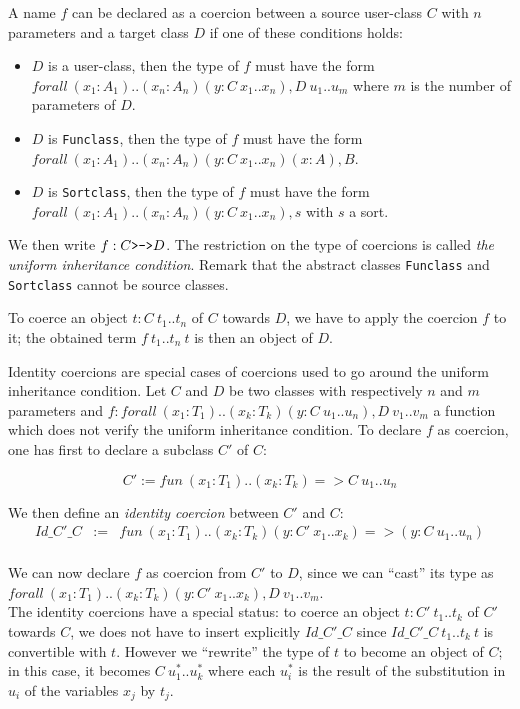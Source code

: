   A name $f$ can be declared as a coercion between a source user-class
$C$ with $n$ parameters and a target class $D$ if one of these
conditions holds:

\newcommand{\oftype}{\!:\!}

\begin{itemize}
\item $D$ is a user-class, then the type of $f$ must have the form
      $forall~ (x_1 \oftype A_1)..(x_n \oftype A_n)(y\oftype C~x_1..x_n), D~u_1..u_m$ where $m$
      is the number of parameters of $D$.
\item $D$ is {\tt Funclass}, then the type of $f$ must have the form
      $forall~ (x_1\oftype A_1)..(x_n\oftype A_n)(y\oftype C~x_1..x_n)(x:A), B$.
\item $D$ is {\tt Sortclass}, then the type of $f$ must have the form
      $forall~ (x_1\oftype A_1)..(x_n\oftype A_n)(y\oftype C~x_1..x_n), s$ with $s$ a sort.
\end{itemize}

We then write $f:C \mbox{\texttt{>->}} D$. The restriction on the type
of coercions is called {\em the uniform inheritance condition}.
Remark that the abstract classes {\tt Funclass} and {\tt Sortclass}
cannot be source classes.

To coerce an object $t:C~t_1..t_n$ of $C$ towards $D$, we have to
apply the coercion $f$ to it; the obtained term $f~t_1..t_n~t$ is
then an object of $D$.


  Identity coercions are special cases of coercions used to go around
the uniform inheritance condition.  Let $C$ and $D$ be two classes
with respectively $n$ and $m$ parameters and
$f:forall~(x_1:T_1)..(x_k:T_k)(y:C~u_1..u_n), D~v_1..v_m$ a function which
does not verify the uniform inheritance condition. To declare $f$ as
coercion, one has first to declare a subclass $C'$ of $C$:

$$C' := fun~ (x_1:T_1)..(x_k:T_k) => C~u_1..u_n$$

\noindent We then define an {\em identity coercion} between $C'$ and $C$:
\begin{eqnarray*}
Id\_C'\_C  & := & fun~ (x_1:T_1)..(x_k:T_k)(y:C'~x_1..x_k) => (y:C~u_1..u_n)\\
\end{eqnarray*}

We can now declare $f$ as coercion from $C'$ to $D$, since we can
``cast'' its type as
$forall~ (x_1:T_1)..(x_k:T_k)(y:C'~x_1..x_k),D~v_1..v_m$.\\ The identity
coercions have a special status: to coerce an object $t:C'~t_1..t_k$
of $C'$ towards $C$, we does not have to insert explicitly $Id\_C'\_C$
since $Id\_C'\_C~t_1..t_k~t$ is convertible with $t$.  However we
``rewrite'' the type of $t$ to become an object of $C$; in this case,
it becomes $C~u_1^*..u_k^*$ where each $u_i^*$ is the result of the
substitution in $u_i$ of the variables $x_j$ by $t_j$.


